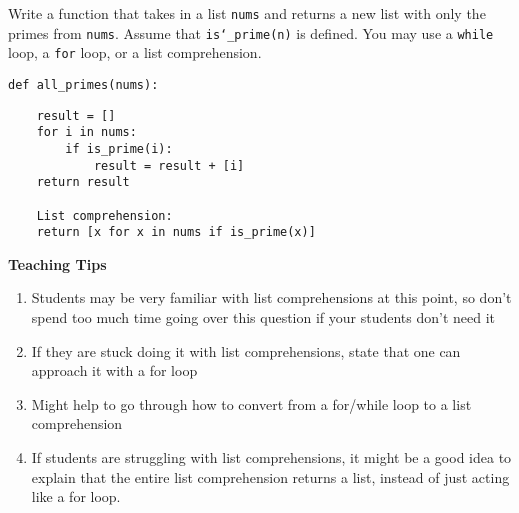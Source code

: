 \begin{blocksection}
\question Write a function that takes in a list \texttt{nums} and returns a
new list with only the primes from \texttt{nums}. Assume that
\texttt{is\char`_prime(n)} is defined. You may use a \texttt{while} loop, a
\texttt{for} loop, or a list comprehension.

\begin{lstlisting}
def all_primes(nums):
\end{lstlisting}
\begin{solution}[2in]
\begin{lstlisting}
    result = []
    for i in nums:
        if is_prime(i):
            result = result + [i]
    return result

    List comprehension:
    return [x for x in nums if is_prime(x)]
\end{lstlisting}
\end{solution}
\end{blocksection}

\begin{blocksection}
    \begin{guide}
    \textbf{Teaching Tips}
    \begin{enumerate}
            \item Students may be very familiar with list comprehensions at this point, so don’t spend too much time going over this question if your students don’t need it
            \item If they are stuck doing it with list comprehensions, state that one can approach it with a for loop
            \item Might help to go through how to convert from a for/while loop to a list comprehension
            \item If students are struggling with list comprehensions, it might be a good idea to explain that the entire list comprehension returns a list, instead of just acting like a for loop.
    \end{enumerate}
    \end{guide}
\end{blocksection}